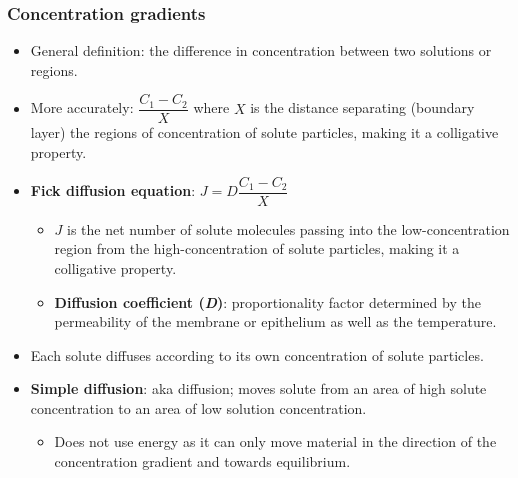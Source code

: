 \documentclass[12pt,a4paper]{article}
\begin{document}
    \subsubsection{Concentration gradients}
        \begin{itemize}
            \item General definition: the difference in concentration between two solutions or regions.
            \item More accurately: \(\dfrac{C_1 - C_2}{X}\) where \(X\) is the distance separating (boundary layer) the regions of concentration of solute particles, making it a colligative property.
            \item \textbf{Fick diffusion equation}: \(J=D\dfrac{C_1 - C_2}{X}\)
                \begin{itemize}
                    \item \(J\) is the net number of solute molecules passing into the low-concentration region from the high-concentration of solute particles, making it a colligative property.
                    \item \textbf{Diffusion coefficient (\textit{D})}: proportionality factor determined by the permeability of the membrane or epithelium as well as the temperature.
                \end{itemize}
            \item Each solute diffuses according to its own concentration of solute particles.
            \item \textbf{Simple diffusion}: aka diffusion; moves solute from an area of high solute concentration to an area of low solution concentration.
            \begin{itemize}
                \item Does not use energy as it can only move material in the direction of the concentration gradient and towards 
                equilibrium.
            \end{itemize}
        \end{itemize}
\end{document}
